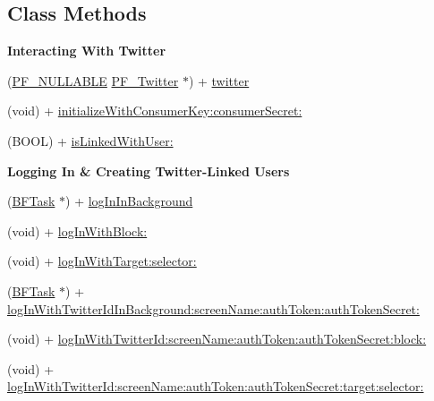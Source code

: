 \subsection*{Class Methods}
\begin{Indent}{\bf Interacting With Twitter}\par
{\em 

 

 }\begin{DoxyCompactItemize}
\item 
(\hyperlink{_p_f_nullability_8h_a528d97a96c5fb279a45c378f5657fca2}{P\+F\+\_\+\+N\+U\+L\+L\+A\+B\+L\+E} \hyperlink{interface_p_f___twitter}{P\+F\+\_\+\+Twitter} $\ast$) + \hyperlink{interface_p_f_twitter_utils_a6b8ce4bc0533455a9d9a0790216a00e5}{twitter}
\item 
(void) + \hyperlink{interface_p_f_twitter_utils_a88b7ca865f58b38e1f6afca2312ec182}{initialize\+With\+Consumer\+Key\+:consumer\+Secret\+:}
\item 
(B\+O\+O\+L) + \hyperlink{interface_p_f_twitter_utils_af8b1700a059aa3eb9828779395f70c4a}{is\+Linked\+With\+User\+:}
\end{DoxyCompactItemize}
\end{Indent}
\begin{Indent}{\bf Logging In \& Creating Twitter-\/\+Linked Users}\par
{\em 

 

 }\begin{DoxyCompactItemize}
\item 
(\hyperlink{interface_b_f_task}{B\+F\+Task} $\ast$) + \hyperlink{interface_p_f_twitter_utils_a92e1eac9fe329a12b44cf8e720f1653b}{log\+In\+In\+Background}
\item 
(void) + \hyperlink{interface_p_f_twitter_utils_aa0d65c7737dab2d1b8ab8d8f32de0d5c}{log\+In\+With\+Block\+:}
\item 
(void) + \hyperlink{interface_p_f_twitter_utils_a7b4c41e315381294d3d891168ef3e17c}{log\+In\+With\+Target\+:selector\+:}
\item 
(\hyperlink{interface_b_f_task}{B\+F\+Task} $\ast$) + \hyperlink{interface_p_f_twitter_utils_aeee2be96e31173108a69f14d55983362}{log\+In\+With\+Twitter\+Id\+In\+Background\+:screen\+Name\+:auth\+Token\+:auth\+Token\+Secret\+:}
\item 
(void) + \hyperlink{interface_p_f_twitter_utils_a0765db35628d6a800a615f9254bb2bf0}{log\+In\+With\+Twitter\+Id\+:screen\+Name\+:auth\+Token\+:auth\+Token\+Secret\+:block\+:}
\item 
(void) + \hyperlink{interface_p_f_twitter_utils_a03151c53b54213d832251aad001da4d0}{log\+In\+With\+Twitter\+Id\+:screen\+Name\+:auth\+Token\+:auth\+Token\+Secret\+:target\+:selector\+:}
\end{DoxyCompactItemize}
\end{Indent}
